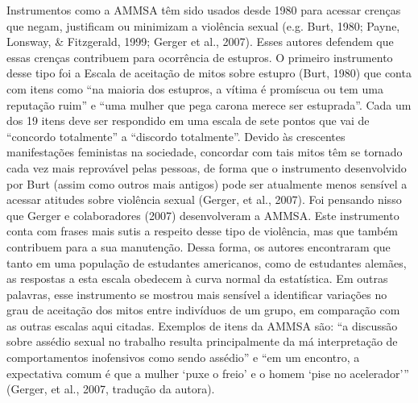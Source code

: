 Instrumentos como a AMMSA têm sido usados desde 1980 para acessar crenças que negam, justificam ou minimizam a violência sexual (e.g. Burt, 1980; Payne, Lonsway, \& Fitzgerald, 1999; Gerger et al., 2007). Esses autores defendem que essas crenças contribuem para ocorrência de estupros. O primeiro instrumento desse tipo foi a Escala de aceitação de mitos sobre estupro (Burt, 1980) que conta com itens como ``na maioria dos estupros, a vítima é promíscua ou tem uma reputação ruim'' e ``uma mulher que pega carona merece ser estuprada''. Cada um dos 19 itens deve ser respondido em uma escala de sete pontos que vai de ``concordo totalmente'' a ``discordo totalmente''. Devido às crescentes manifestações feministas na sociedade, concordar com tais mitos têm se tornado cada vez mais reprovável pelas pessoas, de forma que o instrumento desenvolvido por Burt (assim como outros mais antigos) pode ser atualmente menos sensível a acessar atitudes sobre violência sexual (Gerger, et al., 2007). Foi pensando nisso que Gerger e colaboradores (2007) desenvolveram a AMMSA. Este instrumento conta com frases mais sutis a respeito desse tipo de violência, mas que também contribuem para a sua manutenção. Dessa forma, os autores encontraram que tanto em uma população de estudantes americanos, como de estudantes alemães, as respostas a esta escala obedecem à curva normal da estatística. Em outras palavras, esse instrumento se mostrou mais sensível a identificar variações no grau de aceitação dos mitos entre indivíduos de um grupo, em comparação com as outras escalas aqui citadas. Exemplos de itens da AMMSA são: ``a discussão sobre assédio sexual no trabalho resulta principalmente da má interpretação de comportamentos inofensivos como sendo assédio'' e ``em um encontro, a expectativa comum é que a mulher ‘puxe o freio’ e o homem ‘pise no acelerador’'' (Gerger, et al., 2007, tradução da autora).

